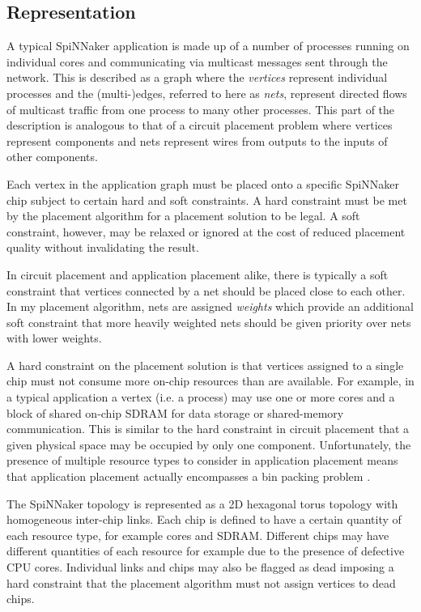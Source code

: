 		\subsection{Representation}
			
			A typical SpiNNaker application is made up of a number of processes
			running on individual cores and communicating via multicast messages sent
			through the network. This is described as a graph where the
			\emph{vertices} represent individual processes and the (multi-)edges,
			referred to here as \emph{nets}, represent directed flows of multicast
			traffic from one process to many other processes. This part of the
			description is analogous to that of a circuit placement problem where
			vertices represent components and nets represent wires from outputs to
			the inputs of other components.
			
			Each vertex in the application graph must be placed onto a specific
			SpiNNaker chip subject to certain hard and soft constraints. A hard
			constraint must be met by the placement algorithm for a placement
			solution to be legal. A soft constraint, however, may be relaxed or
			ignored at the cost of reduced placement quality without invalidating the
			result.
			
			In circuit placement and application placement alike, there is typically
			a soft constraint that vertices connected by a net should be placed close
			to each other. In my placement algorithm, nets are assigned
			\emph{weights} which provide an additional soft constraint that more
			heavily weighted nets should be given priority over nets with lower
			weights.
			
			A hard constraint on the placement solution is that vertices assigned to
			a single chip must not consume more on-chip resources than are available.
			For example, in a typical application a vertex (i.e. a process) may use
			one or more cores and a block of shared on-chip SDRAM for data storage or
			shared-memory communication. This is similar to the hard constraint in
			circuit placement that a given physical space may be occupied by only one
			component. Unfortunately, the presence of multiple resource types to
			consider in application placement means that application placement
			actually encompasses a bin packing problem \cite{korte06}.
			
			The SpiNNaker topology is represented as a 2D hexagonal torus topology
			with homogeneous inter-chip links. Each chip is defined to have a certain
			quantity of each resource type, for example cores and SDRAM. Different
			chips may have different quantities of each resource for example due to
			the presence of defective CPU cores. Individual links and chips may also
			be flagged as dead imposing a hard constraint that the placement
			algorithm must not assign vertices to dead chips.
		
